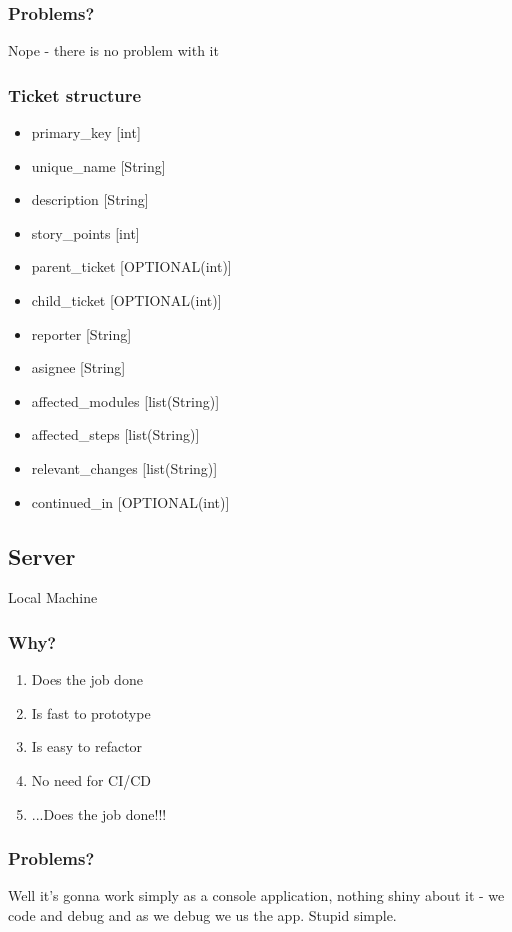 \subsubsection{Problems?}
Nope - there is no problem with it
\subsubsection{Ticket structure}
\begin{itemize}
  \item primary\_key        [int]
  \item unique\_name        [String]
  \item description         [String]
  \item story\_points       [int]
  \item parent\_ticket      [OPTIONAL(int)]
  \item child\_ticket       [OPTIONAL(int)]
  \item reporter            [String]
  \item asignee             [String]
  \item affected\_modules   [list(String)]
  \item affected\_steps     [list(String)]
  \item relevant\_changes   [list(String)]
  \item continued\_in       [OPTIONAL(int)]
\end{itemize}

\subsection{Server}\label{SRV:POC}
Local Machine
\subsubsection{Why?}
\begin{enumerate}
    \item Does the job done
    \item Is fast to prototype
    \item Is easy to refactor
    \item No need for CI/CD
    \item ...Does the job done!!!
\end{enumerate}
\subsubsection{Problems?}
Well it's gonna work simply as a console application, nothing shiny about it - we code and debug and as we debug we us the app. Stupid simple. 
\newpage

